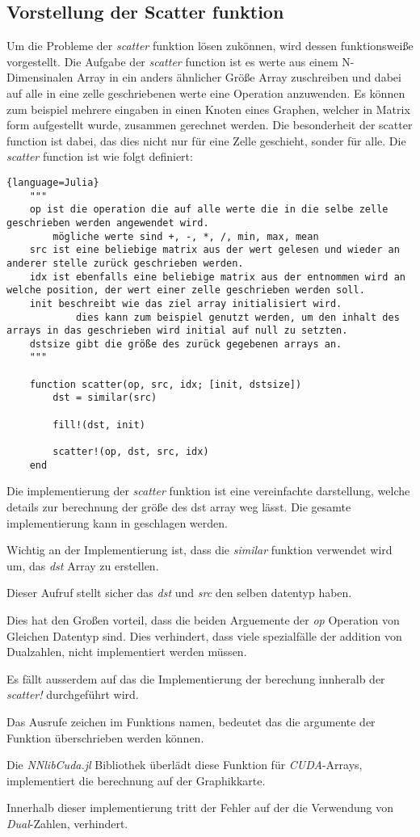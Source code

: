 \subsection{Vorstellung der Scatter funktion}

Um die Probleme der \textit{scatter} funktion lösen zukönnen, 
wird dessen funktionsweiße vorgestellt.
Die Aufgabe der \textit{scatter} function ist es werte aus einem N-Dimensinalen Array in ein anders 
ähnlicher Größe Array zuschreiben und dabei auf alle in eine zelle geschriebenen werte eine Operation anzuwenden.
Es können zum beispiel mehrere eingaben in einen Knoten eines Graphen, 
welcher in Matrix form aufgestellt wurde,
zusammen gerechnet werden.
Die besonderheit der scatter function ist dabei, 
das dies nicht nur für eine Zelle geschieht, 
sonder für alle.
Die \textit{scatter} function ist wie folgt definiert:

\begin{lstlisting}{language=Julia}
	"""
	op ist die operation die auf alle werte die in die selbe zelle geschrieben werden angewendet wird.
		mögliche werte sind +, -, *, /, min, max, mean
	src ist eine beliebige matrix aus der wert gelesen und wieder an anderer stelle zurück geschrieben werden.
	idx ist ebenfalls eine beliebige matrix aus der entnommen wird an welche position, der wert einer zelle geschrieben werden soll.
	init beschreibt wie das ziel array initialisiert wird.
			dies kann zum beispiel genutzt werden, um den inhalt des arrays in das geschrieben wird initial auf null zu setzten.
	dstsize gibt die größe des zurück gegebenen arrays an.
	"""

	function scatter(op, src, idx; [init, dstsize])
		dst = similar(src)
		
		fill!(dst, init)
		
		scatter!(op, dst, src, idx)
	end
\end{lstlisting}

Die implementierung der \textit{scatter} funktion ist eine vereinfachte darstellung, 
welche details zur berechnung der größe des dst array weg lässt.
Die gesamte implementierung kann in  \cite{} geschlagen werden.

Wichtig an der Implementierung ist, dass die \textit{similar} funktion verwendet wird um, das
\textit{dst} Array zu erstellen.

Dieser Aufruf stellt sicher das \textit{dst} und \textit{src} den selben datentyp haben.

Dies hat den Großen vorteil, 
dass die beiden Arguemente der \textit{op} Operation von Gleichen Datentyp sind. 
Dies verhindert, 
dass viele spezialfälle der addition von Dualzahlen, nicht implementiert werden müssen.

Es fällt ausserdem auf das die Implementierung der berechung innheralb der \textit{scatter!}
durchgeführt wird.


Das Ausrufe zeichen im Funktions namen, bedeutet das die argumente der Funktion überschrieben werden können.


Die \textit{NNlibCuda.jl} Bibliothek überlädt diese Funktion für \textit{CUDA}-Arrays,
implementiert die berechnung auf der Graphikkarte.

Innerhalb dieser implementierung tritt der Fehler auf der die Verwendung von \textit{Dual}-Zahlen,
verhindert.
